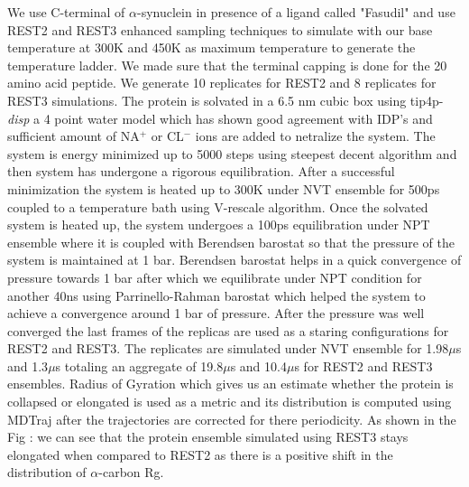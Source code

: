 We use C-terminal of $\alpha$-synuclein in presence of a ligand called "Fasudil" and use REST2 and REST3 enhanced sampling techniques to simulate with our base temperature at 300K 
and 450K as maximum temperature to generate the temperature ladder.
We made sure that the terminal capping is done for the 20 amino acid peptide.
We generate 10 replicates for REST2 and 8 replicates for REST3 simulations.
The protein is solvated in a 6.5 nm cubic box using tip4p-\textit{disp} a 4 point water model which has shown good agreement with IDP's and sufficient amount of NA$^{+}$ or CL$^{-}$ ions are added to netralize the 
system.
The system is energy minimized up to 5000 steps using steepest decent algorithm and then system has undergone a rigorous equilibration.
After a successful minimization the system is heated up to 300K under NVT ensemble for 500ps coupled to a temperature bath using V-rescale algorithm.
Once the solvated system is heated up, the system undergoes a 100ps equilibration under NPT ensemble where it is coupled with Berendsen barostat so that the pressure of the system 
is maintained at 1 bar.
Berendsen barostat helps in a quick convergence of pressure towards 1 bar after which we equilibrate under NPT condition for another 40ns using Parrinello-Rahman barostat which 
helped the system to achieve a convergence around 1 bar of pressure.
After the pressure was well converged the last frames of the replicas are used as a staring configurations for REST2 and REST3. 
The replicates are simulated under NVT ensemble for 1.98$\mu$s and 1.3$\mu$s totaling an aggregate of 19.8$\mu$s and 10.4$\mu$s for REST2 and REST3 ensembles.
Radius of Gyration which gives us an estimate whether the protein is collapsed or elongated is used as a metric and its distribution is computed using MDTraj after the trajectories 
are corrected for there periodicity.
As shown in the Fig : we can see that the protein ensemble simulated using REST3 stays elongated when compared to REST2 as there is a positive shift in the distribution of 
$\alpha$-carbon Rg. 

